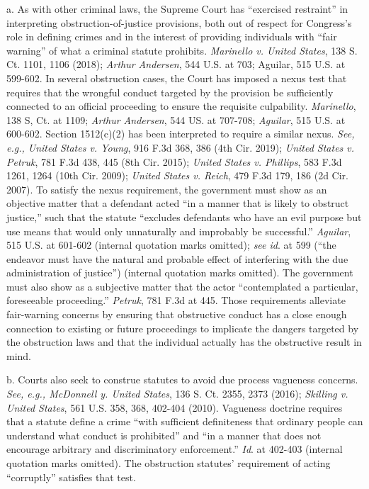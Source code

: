 a. As with other criminal laws, the Supreme Court has “exercised restraint” in interpreting obstruction-of-justice provisions, both out of respect for Congress’s role in defining crimes and in the interest of providing individuals with “fair warning” of what a criminal statute prohibits.
\textit{Marinello v. United States}, 138 S. Ct. 1101, 1106 (2018);
\textit{Arthur Andersen}, 544 U.S. at 703; Aguilar, 515 U.S. at 599-602.
In several obstruction cases, the Court has imposed a nexus test that requires that the wrongful conduct targeted by the provision be sufficiently connected to an official proceeding to ensure the requisite culpability.
\textit{Marinello}, 138 S, Ct. at 1109;
\textit{Arthur Andersen}, 544 US. at 707-708;
\textit{Aguilar}, 515 U.S. at 600-602.
Section 1512(c)(2) has been interpreted to require a similar nexus.
\textit{See, e.g., United States v. Young}, 916 F.3d 368, 386 (4th Cir. 2019);
\textit{United States v. Petruk}, 781 F.3d 438, 445 (8th Cir. 2015);
\textit{United States v. Phillips}, 583 F.3d 1261, 1264 (10th Cir. 2009);
\textit{United States v. Reich}, 479 F.3d 179, 186 (2d Cir. 2007).
To satisfy the nexus requirement, the government must show as an objective matter that a defendant acted “in a manner that is likely to obstruct justice,” such that the statute “excludes defendants who have an evil purpose but use means that would only unnaturally and improbably be successful.”
\textit{Aguilar}, 515 U.S. at 601-602 (internal quotation marks omitted);
\textit{see id}. at 599 (“the endeavor must have the natural and probable effect of interfering with the due administration of justice”) (internal quotation marks omitted).
The government must also show as a subjective matter that the actor “contemplated a particular, foreseeable proceeding.”
\textit{Petruk}, 781 F.3d at 445.
Those requirements alleviate fair-warning concerns by ensuring that obstructive conduct has a close enough connection to existing or future proceedings to implicate the dangers targeted by the obstruction laws and that the individual actually has the obstructive result in mind.

b. Courts also seek to construe statutes to avoid due process vagueness concerns.
\textit{See, e.g., McDonnell y. United States}, 136 S. Ct. 2355, 2373 (2016);
\textit{Skilling v. United States}, 561 U.S. 358, 368, 402-404 (2010).
Vagueness doctrine requires that a statute define a crime “with sufficient definiteness that ordinary people can understand what conduct is prohibited” and “in a manner that does not encourage arbitrary and discriminatory enforcement.”
\textit{Id}. at 402-403 (internal quotation marks omitted).
The obstruction statutes’ requirement of acting “corruptly” satisfies that test.

